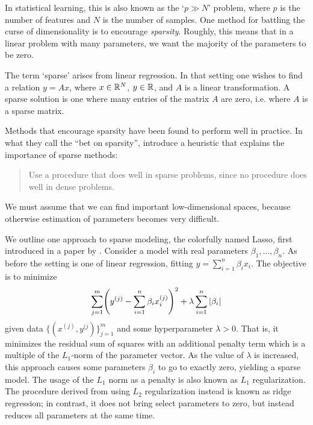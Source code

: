 \documentclass[cclicense]{hmcthesis}
\numberwithin{equation}{chapter}
\numberwithin{thmcounter}{chapter}
\begin{document}
    In statistical learning, this is also known as the `$p \gg N$' problem,
    where $p$ is the number of features and $N$ is the number of samples.  One
    method for battling the curse of dimensionality is to encourage
    \emph{sparsity}.  Roughly, this means that in a linear problem with many
    parameters, we want the majority of the parameters to be zero.
    
    \begin{example}
        The term `sparse' arises from linear regression.  In that setting one
        wishes to find a relation $y = Ax$, where $x \in \mathbb{R}^N$, $y \in \mathbb{R}$, and
        $A$ is a linear transformation.  A sparse solution is one where many
        entries of the matrix $A$ are zero, i.e. where $A$ is a sparse matrix.
    \end{example}
    
    Methods that encourage sparsity have been found to perform well in practice.
    In what they call the ``bet on sparsity'', \citet{EOSL} introduce a
    heuristic that explains the importance of sparse methods:
    \begin{quote}
        Use a procedure that does well in sparse problems, since no procedure
        does well in dense problems.
    \end{quote}
    \noindent We must assume that we can find important low-dimensional spaces,
    because otherwise estimation of parameters becomes very difficult.

    We outline one approach to sparse modeling, the colorfully named Lasso, first
    introduced in a paper by \citet{LASSO}.  Consider a model with real
    parameters $\beta_1, \ldots, \beta_n$.  As before the setting is one of
    linear regression, fitting $y = \sum_{i=1}^n \beta_i x_i$.  The objective is to
    minimize
    \[
        \sum_{j=1}^m \pdel*{y^{(j)} - \sum_{i=1}^n \beta_i x_i^{(j)}}^2 +
        \lambda \sum_{i=1}^n |\beta_i|
    \]
    given data $\{(x^{(j)}, y^{(j})\}_{j=1}^m$ and some hyperparameter $\lambda
    > 0$.  That is, it minimizes the residual sum of squares with an additional
    penalty term which is a multiple of the $L_1$-norm of the parameter vector.
    As the value of $\lambda$ is increased, this approach causes some parameters
    $\beta_i$ to go to exactly zero, yielding a sparse model.  The usage of the
    $L_1$ norm as a penalty is also known as $L_1$ regularization.  The
    procedure derived from using $L_2$ regularization instead is known as ridge
    regression; in contrast, it does not bring select parameters to zero, but
    instead reduces all parameters at the same time.
\end{document}

